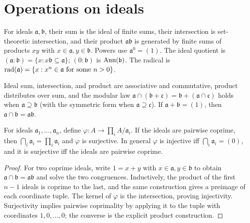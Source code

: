 \section{Operations on ideals}
\label{am-ch1-operations}
\begin{definition}
\label{am-def-ideal-operations}
\uses{}
For ideals $\mathfrak{a},\mathfrak{b}$, their sum is the ideal of finite sums, their
intersection is set-theoretic intersection, and their product $\mathfrak{a}\mathfrak{b}$
is generated by finite sums of products $xy$ with $x\in\mathfrak{a},y\in\mathfrak{b}$.
Powers use $\mathfrak{a}^0=(1)$.  The ideal quotient is
$(\mathfrak{a}:\mathfrak{b})=\{x:x\mathfrak{b}\subseteq\mathfrak{a}\}$; $(0:\mathfrak{b})$ is
$\operatorname{Ann}(\mathfrak{b})$.  The radical is
$\operatorname{rad}(\mathfrak{a})=\{x:x^n\in\mathfrak{a}\text{ for some }n>0\}$.
\end{definition}
\begin{remark}
\label{am-rem-ideal-identities}
\uses{}
Ideal sum, intersection, and product are associative and commutative, product
distributes over sum, and the modular law
$\mathfrak{a}\cap(\mathfrak{b}+\mathfrak{c})=\mathfrak{b}+(\mathfrak{a}\cap\mathfrak{c})$
holds when $\mathfrak{a}\supseteq\mathfrak{b}$ (with the symmetric form when
$\mathfrak{a}\supseteq\mathfrak{c}$).  If
$\mathfrak{a}+\mathfrak{b}=(1)$, then $\mathfrak{a}\cap\mathfrak{b}=\mathfrak{a}\mathfrak{b}$.
\end{remark}
\begin{proposition}
\label{am-prop-1-10}
\uses{}
For ideals $\mathfrak{a}_1,\ldots,\mathfrak{a}_n$, define
$\varphi:A\to\prod_i A/\mathfrak{a}_i$.  If the ideals are pairwise coprime, then
$\bigcap_i\mathfrak{a}_i=\prod_i\mathfrak{a}_i$ and $\varphi$ is surjective.  In general
$\varphi$ is injective iff $\bigcap_i\mathfrak{a}_i=(0)$, and it is surjective iff
the ideals are pairwise coprime.
\end{proposition}
\begin{proof}
For two coprime ideals, write $1=x+y$ with $x\in\mathfrak{a},y\in\mathfrak{b}$ to
obtain $\mathfrak{a}\cap\mathfrak{b}=\mathfrak{a}\mathfrak{b}$ and solve the two congruences.
Inductively, the product of the first $n-1$ ideals is coprime to the last,
and the same construction gives a preimage of each coordinate tuple.  The
kernel of $\varphi$ is the intersection, proving injectivity.  Surjectivity
implies pairwise coprimality by applying it to the tuple with coordinates
$1,0,\ldots,0$; the converse is the explicit product construction.
\end{proof}
